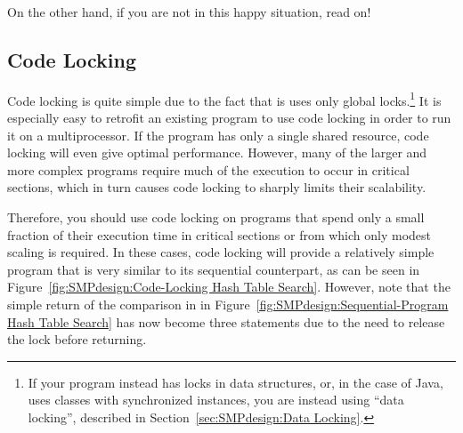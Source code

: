 
On the other hand, if you are not in this happy situation, read on!

\subsection{Code Locking}
\label{sec:SMPdesign:Code Locking}

Code locking is quite simple due to the fact that is uses only
global locks.\footnote{
	If your program instead has locks in data structures,
	or, in the case of Java, uses classes with synchronized
	instances, you are instead using ``data locking'', described
	in Section~\ref{sec:SMPdesign:Data Locking}.}
It is especially
easy to retrofit an existing program to use code locking in
order to run it on a multiprocessor.  If the program has
only a single shared resource, code locking will even give
optimal performance.
However, many of the larger and more complex programs
require much of the execution to
occur in critical sections, which in turn causes code locking
to sharply limits their scalability.

Therefore, you should use code locking on programs that spend
only a small fraction of their execution time in critical sections or
from which only modest scaling is required.  In these cases,
code locking will provide a relatively simple program that is
very similar to its sequential counterpart,
as can be seen in
Figure~\ref{fig:SMPdesign:Code-Locking Hash Table Search}.
However, note that the simple return of the comparison in
 in
Figure~\ref{fig:SMPdesign:Sequential-Program Hash Table Search}
has now become three statements due to the need to release the
lock before returning.

